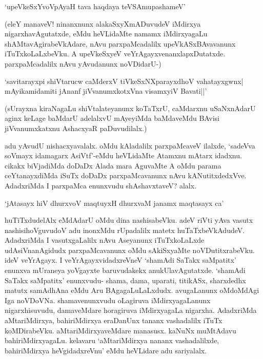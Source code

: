 \begin{shloka}
`upeVkeSxYvoVpAyaH tava haqdaya teVSAmupashameV'
\end{shloka}

(eleY manaveV! ninanxnunx alakaSxyXmADuvudeV iMdirxya nigarxhavAgutatxde, eMdu heVLidaMte namamx iMdirxyagaLu shAMtavAgirabeVkAdare, nAvu parxpaMcadalilx upeVkASxBAvavanunx iTuTxkoLaLxbeVku. A upeVkeSxyeV veYrAgayxvenanxlapxDutatxde. parxpaMcadalilx nAvu yAvudanunx noVDidarU-)

\begin{shloka}
`savitarayxpi shiVtarucw caMderxV tiVkeSxNX\s parayxdhoV vahatayxgwnx|\\
mAyikamidamiti jAnanf jiVvanumxkotxVna visamxyiV Bavati||'
\end{shloka}

(sUrayxna kiraNagaLu shiVtalateyanunx koTaTxrU, caMdarxnu uSaNxnAdarU aginx keLage baMdarU adelalxvU mAyeyiMda baMdaveMdu BAvisi jiVvanumxkatxnu AshacxyaR paDuvudilalx.)

adu yAvudU nishacxyavalalx. oMdu kAladalilx parxpaMcaveV ilalxde, `sadeVva soVmayx idamagarx AsiVtf'-eMdu heVLidaMte Atamxnu mAtarx idadxnu. cikakx biVjadiMda doDaDx Alada mara AguvaMte A oMdu parama ceYtanayxdiMda iSuTx doDaDx parxpaMcavanunx nAvu kANutitxdedxVve. AdadxriMda I parxpaMca enunxvudu shAshavxtaveV? alalx.

\begin{shloka}
`jAtasayx hiV dhurxvoV maqtuyxH dhurxvaM janamx maqtasayx ca'
\end{shloka} 

huTiTxdudelAlx eMdAdarU oMdu dina nashisabeVku. adeV riVti yAva vasutx nashisihoVguvudoV adu inonxMdu rUpadalilx matetx huTaTxbeVkAdudeV. AdadxriMda I vasutxgaLalilx nAvu Aseyanunx iTuTxkoLaLxde udAsiVnanAgidudx parxpaMcavanunx oMdu sAkiSxyaMte noVDutitxrabeVku. ideV veYrAgayx. I veYrAgayxvidadxreVneV `shamAdi SaTakx saMpatitx' enunxva mUraneya yoVgayxte baruvudakekx anukUlavAgutatxde. `shamAdi SaTakx saMpatitx' enunxvudu- shama, dama, uparati, titikASx, sharxdedhx matutx samAdhAna eMdu Aru BAgagaLuLaLxdudx. avugaLanunx oMdoMdAgi Iga noVDoVNa. shamavenunxvudu oLagiruva iMdirxyagaLanunx nigarxhisuvudu, damaveMdare horagiruva iMdirxyagaLa nigarxha. AdadxriMda aMtariMdirxya, bahiriMdirxya eraDanUnx tananx vashadalilx iTuTx koMDirabeVku. aMtariMdirxyaveMdare manasusx. kaNuNx muMtAdavu bahiriMdirxyagaLu. kelavaru `aMtariMdirxya nananx vashadalilxde, bahiriMdirxya heVgidadxreVnu' eMdu heVLidare adu sariyalalx.
 
